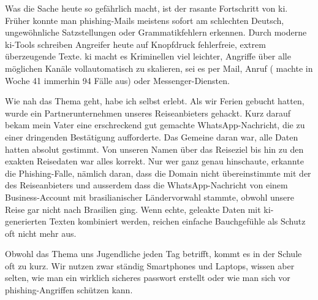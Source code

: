 \documentclass[12pt,a4paper]{article}
\begin{document}
Was die Sache heute so gefährlich macht, ist der rasante Fortschritt von \newline \gls{ki}. Früher konnte man \gls{phishing}-Mails meistens sofort am schlechten Deutsch, \mbox{ungewöhnliche} Satzstellungen oder Grammatikfehlern erkennen. \newline Durch moderne \gls{ki}-Tools schreiben Angreifer heute auf Knopfdruck fehlerfreie, extrem überzeugende Texte. \gls{ki} macht es Kriminellen viel leichter, Angriffe über alle möglichen Kanäle vollautomatisch zu \mbox{skalieren,} sei es per Mail, Anruf ( machte in Woche 41 immerhin 94 Fälle aus\cite{bacs2026statistik}) oder Messenger-Diensten.

Wie nah das Thema geht, habe ich selbst erlebt. Als wir Ferien gebucht hatten, \mbox{wurde} ein Partnerunternehmen unseres Reiseanbieters gehackt. Kurz darauf bekam mein \mbox{Vater} eine erschreckend gut gemachte WhatsApp-Nachricht, die zu einer dringenden Bestätigung aufforderte. Das Gemeine daran war, alle Daten hatten absolut gestimmt. Von unseren Namen über das Reiseziel bis hin zu den exakten Reisedaten war alles \mbox{korrekt.} Nur wer ganz genau hinschaute, erkannte die Phishing-Falle, nämlich daran, dass die Domain nicht übereinstimmte mit der des Reiseanbieters und ausserdem dass die WhatsApp-Nachricht von einem Business-Account mit brasilianischer Ländervorwahl stammte, obwohl unsere Reise gar nicht nach Brasilien ging. Wenn echte, geleakte Daten mit \mbox{\gls{ki}-generierten} Texten kombiniert werden, reichen einfache Bauchgefühle als Schutz oft nicht mehr aus.

Obwohl das Thema uns Jugendliche jeden Tag betrifft, kommt es in der Schule oft zu kurz. Wir nutzen zwar ständig Smartphones und Laptops, wissen aber selten, wie man ein wirklich sicheres \gls{passwort} erstellt oder wie man sich vor \gls{phishing}-Angriffen schützen kann.

\newpage
\end{document}
